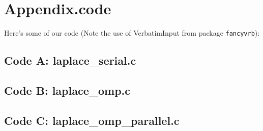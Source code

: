 \documentclass[11pt]{article}
\begin{document}



 


\newpage

\section{Appendix.code}

Here's some of our code (Note the use of VerbatimInput from package \texttt{fancyvrb}):


\subsection{Code A: laplace\_serial.c}


\begin{footnotesize}

\end{footnotesize}




\subsection{Code B: laplace\_omp.c}


\begin{footnotesize}

\end{footnotesize}




\subsection{Code C: laplace\_omp\_parallel.c}


\begin{footnotesize}

\end{footnotesize}
\end{document}
